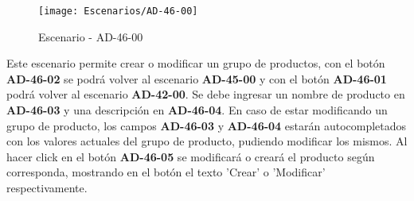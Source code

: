 \begin{figure}[H]
\centering
\texttt{[image: Escenarios/AD-46-00]}
\caption{Escenario - AD-46-00}
\label{fig:AD-46-00}
\end{figure}

Este escenario permite crear o modificar un grupo de productos, con el botón \textbf{AD-46-02} se podrá volver al escenario \textbf{AD-45-00} y con el botón \textbf{AD-46-01} podrá volver al escenario \textbf{AD-42-00}. Se debe ingresar un nombre de producto en \textbf{AD-46-03} y una descripción en \textbf{AD-46-04}. En caso de estar modificando un grupo de producto, los campos \textbf{AD-46-03} y \textbf{AD-46-04} estarán autocompletados con los valores actuales del grupo de producto, pudiendo modificar los mismos. Al hacer click en el botón \textbf{AD-46-05} se modificará o creará el producto según corresponda, mostrando en el botón el texto 'Crear' o 'Modificar' respectivamente.
\\
